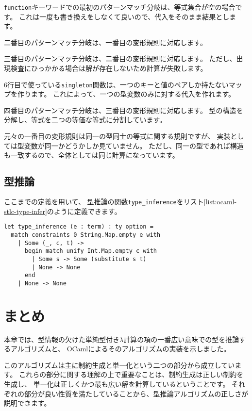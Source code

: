 \texttt{function}キーワードでの最初のパターンマッチ分岐は、等式集合が空の場合です。
これは一度も書き換えをしなくて良いので、代入をそのまま結果とします。

二番目のパターンマッチ分岐は、一番目の変形規則に対応します。

三番目のパターンマッチ分岐は、二番目の変形規則に対応します。
ただし、出現検査にひっかかる場合は解が存在しないため計算が失敗します。

6行目で使っている\texttt{singleton}関数は、一つのキーと値のペアしか持たないマップを作ります。
これによって、一つの型変数のみに対する代入を作れます。

四番目のパターンマッチ分岐は、三番目の変形規則に対応します。
型の構造を分解し、等式を二つの等価な等式に分割しています。

元々の一番目の変形規則は同一の型同士の等式に関する規則ですが、
実装としては型変数が同一かどうかしか見ていません。
ただし、同一の型であれば構造も一致するので、全体としては同じ計算になっています。

\subsection{型推論}

ここまでの定義を用いて、
型推論の関数\texttt{type\_inference}をリスト\ref{list:ocaml-stlc-type-infer}のように定義できます。

\begin{lstlisting}[caption=型推論, label=list:ocaml-stlc-type-infer]
let type_inference (e : term) : ty option =
  match constraints 0 String.Map.empty e with
    | Some (_, c, t) ->
      begin match unify Int.Map.empty c with
        | Some s -> Some (substitute s t)
        | None -> None
      end
    | None -> None
\end{lstlisting}

\section{まとめ}

本章では、型情報の欠けた単純型付き$\lambda$計算の項の一番広い意味での型を推論するアルゴリズムと、
OCamlによるそのアルゴリズムの実装を示しました。

このアルゴリズムは主に制約生成と単一化という二つの部分から成立しています。
これらの部分に関する理解の上で重要なことは、制約生成は正しい制約を生成し、
単一化は正しくかつ最も広い解を計算しているということです。
それぞれの部分が良い性質を満たしていることから、型推論アルゴリズムの正しさが説明できます。

